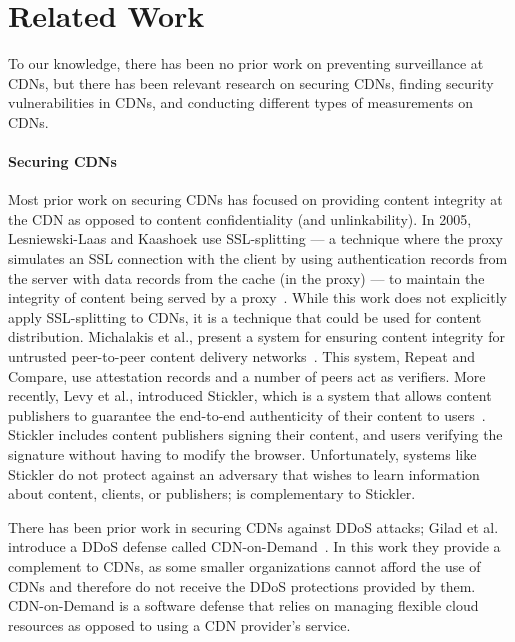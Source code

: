 \section{Related Work}
\label{sec:related}

To our knowledge, there has been no prior work on preventing surveillance at CDNs, but there 
has been relevant research on securing CDNs, finding security vulnerabilities in CDNs, and 
conducting different types of measurements on CDNs.

\paragraph{Securing CDNs} Most prior work on securing CDNs has focused on providing content 
integrity at the CDN as opposed to content confidentiality (and unlinkability).  In 2005, 
Lesniewski-Laas and Kaashoek use SSL-splitting --- a technique 
where the proxy simulates an SSL connection with the client by using authentication records from 
the server with data records from the cache (in the proxy) --- to maintain the 
integrity of content being served by a proxy~\cite{lesniewski2005ssl}.  While this work does not 
explicitly apply SSL-splitting to CDNs, it is a technique that could be used for content 
distribution.  Michalakis et al., present a system for ensuring content integrity for untrusted 
peer-to-peer content delivery networks~\cite{michalakis2007ensuring}.  This system, Repeat and 
Compare, use attestation records and a number of peers act as verifiers.  More recently, Levy et al., 
introduced Stickler, which is a system that allows content publishers to guarantee the end-to-end 
authenticity of their content to users~\cite{levy2015stickler}.  Stickler includes content publishers 
signing their content, and users verifying the signature without having to modify the browser.  Unfortunately, 
systems like Stickler do not protect against an adversary that wishes to learn information about content, clients, 
or publishers; \system{} is complementary to Stickler.

There has been prior work in securing CDNs against DDoS attacks; Gilad 
et al. introduce a DDoS defense called CDN-on-Demand~\cite{gilad2016cdn}.  In this work they 
provide a complement to CDNs, as some smaller organizations cannot afford the use of CDNs and 
therefore do not receive the DDoS protections provided by them.  CDN-on-Demand is a software 
defense that relies on managing flexible cloud resources as opposed to using a CDN provider's 
service.\\

